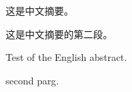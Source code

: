 \begin{cabstract}
	这是中文摘要。
	\par
	这是中文摘要的第二段。
\end{cabstract}

\begin{eabstract}
	Test of the English abstract.
	\par
	second parg.
\end{eabstract}

